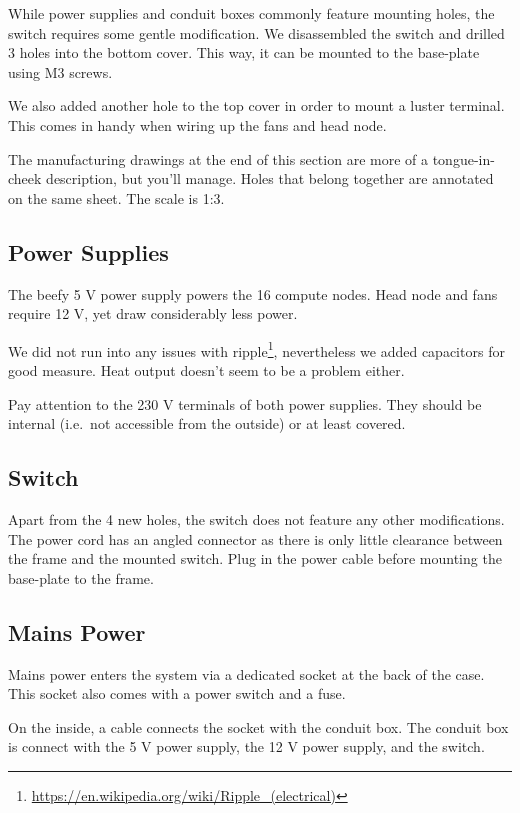 While power supplies and conduit boxes commonly feature mounting holes, the switch requires some gentle modification.
We disassembled the switch and drilled 3 holes into the bottom cover.
This way, it can be mounted to the base-plate using M3 screws.

We also added another hole to the top cover in order to mount a luster terminal.
This comes in handy when wiring up the fans and head node.

The manufacturing drawings at the end of this section are more of a tongue-in-cheek description, but you'll manage.
Holes that belong together are annotated on the same sheet.
The scale is 1:3.

\subsection{Power Supplies}

The beefy 5 V power supply powers the 16 compute nodes.
Head node and fans require 12 V, yet draw considerably less power.

We did not run into any issues with ripple\footnote{\url{https://en.wikipedia.org/wiki/Ripple_(electrical)}}, nevertheless we added capacitors for good measure.
Heat output doesn't seem to be a problem either.

Pay attention to the 230 V terminals of both power supplies.
They should be internal (i.e.\ not accessible from the outside) or at least covered.

\subsection{Switch}

Apart from the 4 new holes, the switch does not feature any other modifications.
The power cord has an angled connector as there is only little clearance between the frame and the mounted switch.
Plug in the power cable before mounting the base-plate to the frame.

\subsection{Mains Power}

Mains power enters the system via a dedicated socket at the back of the case.
This socket also comes with a power switch and a fuse.

On the inside, a cable connects the socket with the conduit box.
The conduit box is connect with the 5 V power supply, the 12 V power supply, and the switch.

